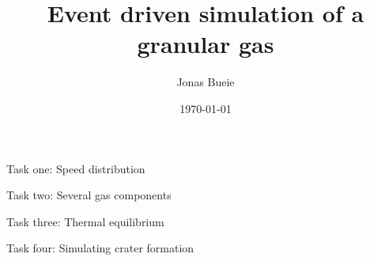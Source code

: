 \documentclass{beamer}
\title{Event driven simulation of a granular gas}
\author{Jonas Bueie}
\date{\today}
\begin{document}
\frame{\titlepage}

\begin{frame}
    \vfill
    \centering
    Task one: Speed distribution 
    \vfill
\end{frame}


\begin{frame}
    \vfill
    \centering
    Task two: Several gas components 
    \vfill
\end{frame}


\begin{frame}
    \vfill
    \centering
    Task three: Thermal equilibrium
    \vfill
\end{frame}


\begin{frame}
    \vfill
    \centering
    Task four: Simulating crater formation 
    \vfill
\end{frame}


\end{document}
